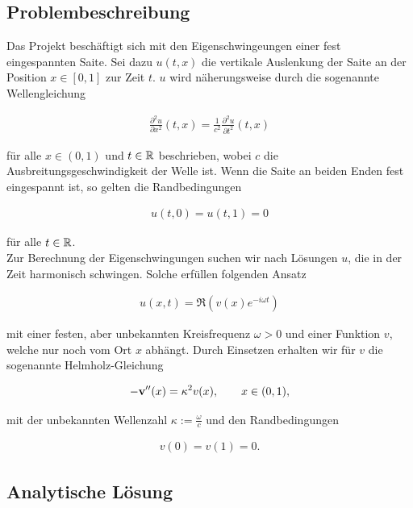 \subsection{Problembeschreibung}

Das Projekt beschäftigt sich mit den Eigenschwingeungen einer fest eingespannten Saite. Sei dazu $u(t, x)$ die vertikale Auslenkung der Saite an der Position $x \in [0, 1]$ zur Zeit $t$. $u$ wird näherungsweise durch die sogenannte Wellengleichung

\begin{align} \label{Wellengleichung}
  \frac{\partial^2 u}{\partial x^2} (t, x) =
  \frac{1}{c^2}
  \frac{\partial^2 u}{\partial t^2} (t, x)
\end{align}

für alle $x \in (0, 1)$ und $t \in \mathbb{R}$ beschrieben, wobei $c$ die Ausbreitungsgeschwindigkeit der Welle ist. Wenn die Saite an beiden Enden fest eingespannt ist, so gelten die Randbedingungen

\begin{align*}
  u(t, 0) = u(t, 1) = 0
\end{align*}

für alle $t \in \mathbb{R}$. \\

Zur Berechnung der Eigenschwingungen suchen wir nach Lösungen $u$, die in der Zeit harmonisch schwingen. Solche erfüllen folgenden Ansatz

\begin{align*}
  u(x, t) = \Re (v(x) e^{-i \omega t})
\end{align*}

mit einer festen, aber unbekannten Kreisfrequenz $\omega > 0$ und einer Funktion $v$, welche nur noch vom Ort $x$ abhängt. Durch Einsetzen erhalten wir für $v$ die sogenannte Helmholz-Gleichung

\begin{align} \label{Helmholz-Gleichung}
  -\mathbf{v}^{\prime \prime}(x) = \kappa^2 v(x), \qquad
  x \in (0, 1),
\end{align}

mit der unbekannten Wellenzahl $\kappa := \frac{\omega}{c}$ und den Randbedingungen

\begin{align} \label{Randbedingungen}
  v(0) = v(1) = 0.
\end{align}

\subsection{Analytische Lösung}

